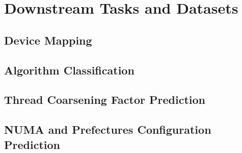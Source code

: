 \section{Downstream Tasks and Datasets}
\label{sec:downstream_and_datasets}


\subsection{Device Mapping}

\subsection{Algorithm Classification}

\subsection{Thread Coarsening Factor Prediction}

\subsection{NUMA and Prefectures Configuration Prediction}